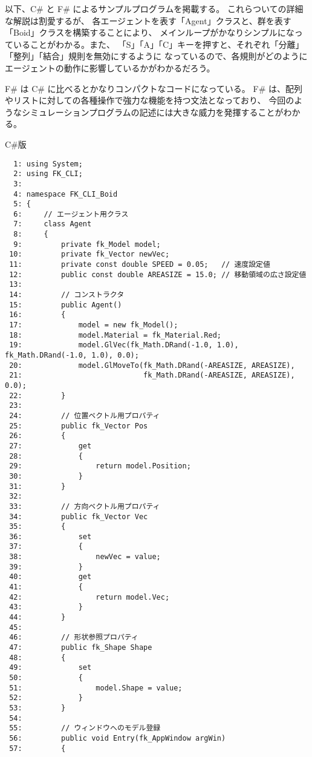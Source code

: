 以下、C\# と F\# によるサンプルプログラムを掲載する。
これらついての詳細な解説は割愛するが、
各エージェントを表す「Agent」クラスと、群を表す「Boid」クラスを構築することにより、
メインループがかなりシンプルになっていることがわかる。また、
「S」「A」「C」キーを押すと、それぞれ「分離」「整列」「結合」規則を無効にするように
なっているので、各規則がどのようにエージェントの動作に影響しているかがわかるだろう。

F\# は C\# に比べるとかなりコンパクトなコードになっている。
F\# は、配列やリストに対しての各種操作で強力な機能を持つ文法となっており、
今回のようなシミュレーションプログラムの記述には大きな威力を発揮することがわかる。

\begin{center}
C\#版
\end{center}
\begin{breakbox}
\begin{small}
\begin{verbatim}
  1: using System;
  2: using FK_CLI;
  3: 
  4: namespace FK_CLI_Boid
  5: {
  6:     // エージェント用クラス
  7:     class Agent
  8:     {
  9:         private fk_Model model;
 10:         private fk_Vector newVec;
 11:         private const double SPEED = 0.05;   // 速度設定値
 12:         public const double AREASIZE = 15.0; // 移動領域の広さ設定値
 13: 
 14:         // コンストラクタ
 15:         public Agent()
 16:         {
 17:             model = new fk_Model();
 18:             model.Material = fk_Material.Red;
 19:             model.GlVec(fk_Math.DRand(-1.0, 1.0), fk_Math.DRand(-1.0, 1.0), 0.0);
 20:             model.GlMoveTo(fk_Math.DRand(-AREASIZE, AREASIZE),
 21:                            fk_Math.DRand(-AREASIZE, AREASIZE), 0.0);
 22:         }
 23: 
 24:         // 位置ベクトル用プロパティ
 25:         public fk_Vector Pos
 26:         {
 27:             get
 28:             {
 29:                 return model.Position;
 30:             }
 31:         }
 32: 
 33:         // 方向ベクトル用プロパティ
 34:         public fk_Vector Vec
 35:         {
 36:             set
 37:             {
 38:                 newVec = value;
 39:             }
 40:             get
 41:             {
 42:                 return model.Vec;
 43:             }
 44:         }
 45: 
 46:         // 形状参照プロパティ
 47:         public fk_Shape Shape
 48:         {
 49:             set
 50:             {
 51:                 model.Shape = value;
 52:             }
 53:         }
 54: 
 55:         // ウィンドウへのモデル登録
 56:         public void Entry(fk_AppWindow argWin)
 57:         {

\end{verbatim}
\end{small}
\end{breakbox}
